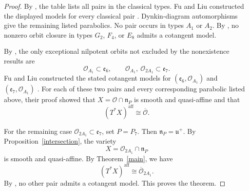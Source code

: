 \documentclass[12pt]{article}
\theoremstyle{definition}
\begin{document}
\begin{proof}
By \cite[Theorem~1.1]{JiaCotangent}, the table lists all pairs in the
classical types. Fu and Liu constructed the displayed models
for every classical pair
\cite[Table~1 and Theorem~4.2]{FuLiu}. Dynkin-diagram automorphisms give
the remaining listed parabolics. No pair occurs in types \(A_1\) or
\(A_2\). By \cite[Theorem~5.1]{JiaCotangent}, no nonzero orbit closure in
types \(G_2\), \(F_4\), or \(E_8\) admits a cotangent model.

By \cite[Theorem~5.2]{JiaCotangent}, the only exceptional nilpotent
orbits not excluded by the nonexistence results are
\[
    \mathcal O_{A_1}\subset\mathfrak e_6,
    \qquad
    \mathcal O_{A_1},\ \mathcal O_{2A_1}\subset\mathfrak e_7.
\]
Fu and Liu constructed the stated cotangent models for
\((\mathfrak e_6,\mathcal O_{A_1})\) and \((\mathfrak e_7,\mathcal O_{A_1})\)
\cite[Table~1 and Theorem~4.2]{FuLiu}. For each of these two pairs and
every corresponding parabolic listed above, their proof showed that
\(X=\mathcal O\cap\mathfrak n_P\) is smooth and quasi-affine and that
\[
    (T^*X)^{\mathrm{aff}}\cong\overline{\mathcal O}.
\]

For the remaining case \(\mathcal O_{2A_1}\subset\mathfrak e_7\), set
\(P=P_7\). Then \(\mathfrak n_P=\mathfrak u^+\). By
Proposition~\ref{intersection}, the variety
\[
    X=\mathcal O_{2A_1}\cap\mathfrak n_P
\]
is smooth and quasi-affine. By Theorem~\ref{main}, we have
\[
    (T^*X)^{\mathrm{aff}}\cong\overline{\mathcal O}_{2A_1}.
\]
By \cite[Theorems~1.1, 5.1, and~5.2]{JiaCotangent}, no other pair admits
a cotangent model. This proves the theorem.
\end{proof}
\end{document}
